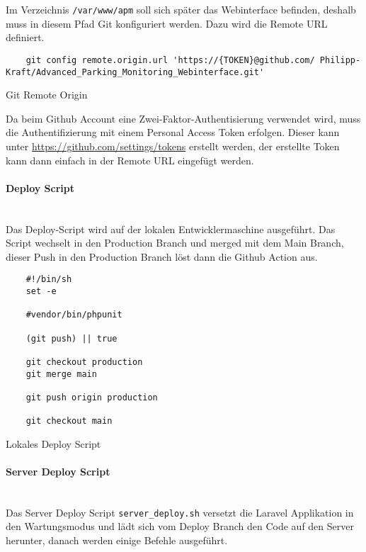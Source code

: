 Im Verzeichnis \verb|/var/www/apm| soll sich später das Webinterface befinden,
deshalb muss in diesem Pfad Git konfiguriert werden. Dazu wird die Remote URL
definiert.

\begin{listing}[H]
  \begin{verbatim}
    git config remote.origin.url 'https://{TOKEN}@github.com/ Philipp-Kraft/Advanced_Parking_Monitoring_Webinterface.git'
  \end{verbatim}
  \caption{Git Remote Origin}
\end{listing}

Da beim Github Account eine Zwei-Faktor-Authentisierung verwendet wird, muss die
Authentifizierung mit einem Personal Access Token erfolgen. Dieser kann unter
\url{https://github.com/settings/tokens} erstellt werden, der erstellte Token
kann dann einfach in der Remote URL eingefügt werden.

\paragraph{Deploy Script}\mbox{}\\

Das Deploy-Script wird auf der lokalen Entwicklermaschine ausgeführt. Das Script
wechselt in den Production Branch und merged mit dem Main Branch, dieser Push in
den Production Branch löst dann die Github Action aus.

\begin{listing}[H]
  \begin{verbatim}
    #!/bin/sh
    set -e
    
    #vendor/bin/phpunit
    
    (git push) || true
    
    git checkout production
    git merge main
    
    git push origin production
    
    git checkout main
  \end{verbatim}
  \caption{Lokales Deploy Script}
\end{listing}

\paragraph{Server Deploy Script}\mbox{}\\

Das Server Deploy Script \verb|server_deploy.sh| versetzt die Laravel
Applikation in den Wartungsmodus und lädt sich vom Deploy Branch den Code auf
den Server herunter, danach werden einige Befehle ausgeführt.

